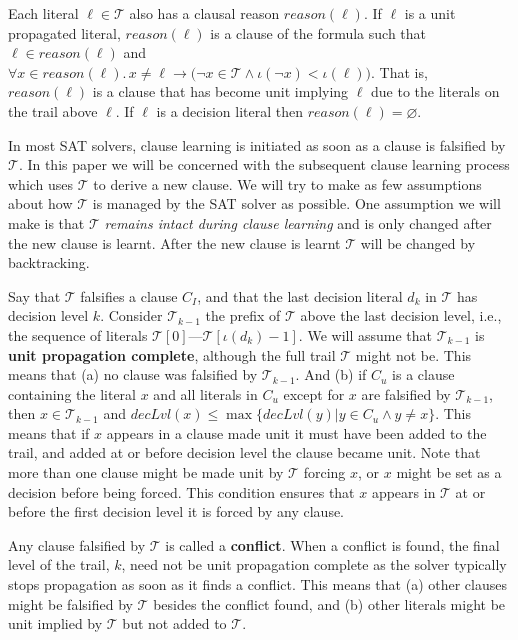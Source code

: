 \documentclass[runningheads]{llncs}
\newcommand{\sat}{SAT\xspace}
\newcommand{\trail}{\ensuremath{\mathcal{T}}}
\newcommand{\trailIdx}[1]{\ensuremath{\iota(#1)}}
\newcommand{\dlevel}[1]{\ensuremath{\mathit{decLvl}(#1)}}
\newcommand{\reason}[1]{\ensuremath{\mathit{reason}(#1)}}
\renewcommand{\implies}{\rightarrow}
\begin{document}
Each literal $\ell\in\trail$ also has a clausal reason
$\reason{\ell}$. If $\ell$ is a unit propagated literal,
$\reason{\ell}$ is a clause of the formula such that
$\ell \in \reason{\ell}$ and
$\forall x \in \reason{\ell}.\, x\neq \ell \implies \bigl(\lnot x \in
\trail \land \trailIdx{\lnot x} < \trailIdx{\ell}\bigr)$. That is,
$\reason{\ell}$ is a clause that has become unit implying $\ell$ due
to the literals on the trail above $\ell$. If $\ell$ is a decision
literal then $\reason{\ell} = \varnothing$.

In most \sat solvers, clause learning is initiated as soon as a clause
is falsified by $\trail$. In this paper we will be concerned with the
subsequent clause learning process which uses $\trail$ to derive a new
clause. We will try to make as few assumptions about how $\trail$ is
managed by the \sat solver as possible. One assumption we will make is
that $\trail$ \emph{remains intact during clause learning} and is only
changed after the new clause is learnt. After the new clause is learnt
$\trail$ will be changed by backtracking.

Say that $\trail$ falsifies a clause $C_I$, and that the last decision
literal $d_k$ in $\trail$ has decision level $k$. Consider
$\trail_{k-1}$ the prefix of $\trail$ above the last decision level,
i.e., the sequence of literals
$\trail[0]$---$\trail[\trailIdx{d_k}-1]$. We will assume that
$\trail_{k-1}$ is \textbf{unit propagation complete}, although the
full trail $\trail$ might not be. This means that (a) no clause was
falsified by $\trail_{k-1}$. And (b) if $C_u$ is a clause containing
the literal $x$ and all literals in $C_u$ except for $x$ are falsified
by $\trail_{k-1}$, then $x\in \trail_{k-1}$ and
$\dlevel{x} \leq\max\{\dlevel{y} | y\in C_u \land y\neq x\}$. This
means that if $x$ appears in a clause made unit it must have been
added to the trail, and added at or before decision level the clause
became unit. Note that more than one clause might be made unit by
$\trail$ forcing $x$, or $x$ might be set as a decision before being
forced. This condition ensures that $x$ appears in $\trail$ at or
before the first decision level it is forced by any clause.

Any clause falsified by $\trail$ is called a \textbf{conflict}. When a
conflict is found, the final level of the trail, $k$, need not be unit
propagation complete as the solver typically stops propagation as soon
as it finds a conflict. This means that (a) other clauses might be
falsified by $\trail$ besides the conflict found, and (b) other
literals might be unit implied by $\trail$ but not added to $\trail$.
\end{document}
